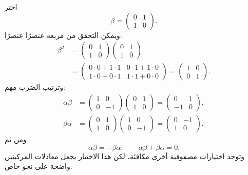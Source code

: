 اختر
\begin{equation}
\beta=
\begin{pmatrix}
0&1\\
1&0
\end{pmatrix}.
\end{equation}
ويمكن التحقق من مربعه عنصرًا عنصرًا:
\begin{equation}
\begin{aligned}
\beta^2
&=
\begin{pmatrix}
0&1\\
1&0
\end{pmatrix}
\begin{pmatrix}
0&1\\
1&0
\end{pmatrix}\\
&=
\begin{pmatrix}
0\cdot0+1\cdot1&0\cdot1+1\cdot0\\
1\cdot0+0\cdot1&1\cdot1+0\cdot0
\end{pmatrix}
=
\begin{pmatrix}
1&0\\
0&1
\end{pmatrix}.
\end{aligned}
\end{equation}
وترتيب الضرب مهم:
\begin{align}
\alpha\beta
&=
\begin{pmatrix}
1&0\\
0&-1
\end{pmatrix}
\begin{pmatrix}
0&1\\
1&0
\end{pmatrix}
=
\begin{pmatrix}
0&1\\
-1&0
\end{pmatrix},\\
\beta\alpha
&=
\begin{pmatrix}
0&1\\
1&0
\end{pmatrix}
\begin{pmatrix}
1&0\\
0&-1
\end{pmatrix}
=
\begin{pmatrix}
0&-1\\
1&0
\end{pmatrix}.
\end{align}
ومن ثم
\begin{equation}
\alpha\beta=-\beta\alpha,
\qquad
\alpha\beta+\beta\alpha=0.
\end{equation}
وتوجد اختيارات مصفوفية أخرى مكافئة، لكن هذا الاختيار يجعل معادلات المركبتين واضحة على نحو خاص.

